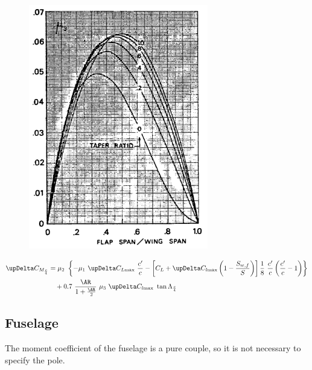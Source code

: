 \begin{figure}[H]
\begin{minipage}{.5\textwidth}
\includegraphics[width=0.94\linewidth]{Immagini/Mu3_Pitching_Moment}
\label{fig:Mu3}
\end{minipage}
\end{figure}
%
\begin{equation}
\begin{split}
\upDelta C_{M_{\frac{c}{4}}}&=\mu_2\ \left\{-\mu_1\ \upDelta C_{L\text{max}}\ \dfrac{c'}{c}-\left[C_L+\upDelta C_{l\text{max}}\left(1-\dfrac{S_{w,f}}{S}\right)\right]\dfrac{1}{8}\ \dfrac{c'}{c}\left(\dfrac{c'}{c}-1\right)\right\}\\
&\quad+0.7\ \dfrac{\AR}{1+\frac{\AR}{2}}\ \mu_3\ \upDelta C_{l\text{max}}\ \tan\Lambda_{\frac{c}{4}}
\label{eqn:DeltaCMPractical}
\end{split}
\end{equation}


\subsection{Fuselage}
The moment coefficient of the fuselage is a pure couple, so it is not necessary to specify the pole.


